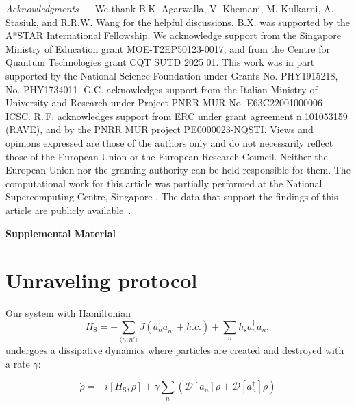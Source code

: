 \documentclass[reprint, superscriptaddress, aps, prl]{revtex4-2}
\begin{document}
\textit{Acknowledgments ---}
We thank B.K. Agarwalla, V. Khemani, M. Kulkarni, A. Stasiuk, and R.R.W. Wang for the helpful discussions.
B.X. was supported by the A*STAR International Fellowship.
We acknowledge support from the Singapore Ministry of Education grant MOE-T2EP50123-0017, and from the Centre for Quantum Technologies grant CQT$\_$SUTD$\_$2025$\_$01.
This work was in part supported by the National Science Foundation under Grants No. PHY1915218, No. PHY1734011.
G.C. acknowledges support from the Italian Ministry of University and Research under Project PNRR-MUR No. E63C22001000006-ICSC.
R.\,F. acknowledges support from  ERC under grant agreement n.101053159 (RAVE), and by the PNRR MUR project PE0000023-NQSTI.
Views and opinions expressed are those of the authors only and do not necessarily reflect those of the European Union or the European Research Council.
Neither the European  Union nor the granting authority can be held responsible for them.
The computational work for this article was partially performed at the National Supercomputing Centre, Singapore \cite{nscc}.
The data that support the findings of this article are publicly available~\cite{data}.




\clearpage

\begin{center}
\textbf{\large Supplemental Material}
\end{center}

\setcounter{section}{0}
\setcounter{equation}{0}
\setcounter{figure}{0}
\setcounter{table}{0}

\renewcommand{\thesection}{S\arabic{section}}
\renewcommand{\theequation}{S\arabic{equation}}
\renewcommand{\thefigure}{S\arabic{figure}}
\renewcommand{\thetable}{S\arabic{table}}

\section{Unraveling protocol}\label{App:unraveling}

Our system with Hamiltonian
\begin{equation}
    H_{\text{S}} = - \sum_{\langle n,n'\rangle} J ( a^\dagger_n a^{}_{n'} + h.c. ) + \sum_nh_{\text{s}} a^\dagger_n a^{}_n,
\end{equation}
undergoes a dissipative dynamics where particles are created and destroyed with a rate $\gamma$:

\begin{equation}\label{Eq:Lindblad}
    \dot\rho=-i[H_{\text{S}},\rho]+\gamma\sum_n(\mathcal{D}[a_n]\rho+\mathcal{D}[a_n^\dagger]\rho)
\end{equation}
\end{document}
